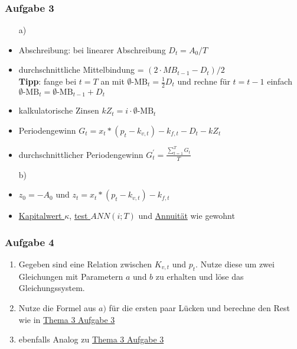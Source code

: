 \documentclass[12pt]{article}
\begin{document}
		\subsubsection*{Aufgabe 3} \label{Thema3Aufgabe3}
		\begin{itemize}
			\item[a)]
			\item Abschreibung: bei linearer Abschreibung $D_t=A_0/T$
			\item durchschnittliche Mittelbindung = $(2\cdot MB_{t-1}-D_t)/2$ \\
			\textbf{Tipp}: fange bei $t=T$ an mit $\emptyset\text{-MB}_{t}=\frac{1}{2}D_t$ und rechne für $t=t-1$ einfach $\emptyset\text{-MB}_{t}=\emptyset\text{-MB}_{t-1}+D_t$
			\item kalkulatorische Zinsen $kZ_t=i\cdot \emptyset\text{-MB}_t$
			\item Periodengewinn $G_t=x_t*(p_t-k_{v,t})-k_{f,t}-D_t-kZ_t$
			\item durchschnittlicher Periodengewinn $G_t^\prime=\frac{\sum_{t=1}^T G_t}{T}$
			\item[b)]
			\item $z_0=-A_0$ und $z_t=x_t*(p_t-k_{v,t})-k_{f,t}$
			\item \hyperref[Kapitalwert]{Kapitalwert $\kappa$}, \hyperref[Annuitaet]{test $ANN(i;T)$} und \hyperref[Annuitaet]{Annuität} wie gewohnt
		\end{itemize}
	
		\subsubsection*{Aufgabe 4}
		\begin{enumerate}[label=\alph*)]
			\item Gegeben sind eine Relation zwischen $K_{v,t}$ und $p_t$. Nutze diese um zwei Gleichungen mit Parametern $a$ und $b$ zu erhalten und löse das Gleichungssystem.
			\item Nutze die Formel aus $a)$ für die ersten paar Lücken und berechne den Rest wie in \hyperref[Thema3Aufgabe3]{Thema 3 Aufgabe 3}
			\item ebenfalls Analog zu \hyperref[Thema3Aufgabe3]{Thema 3 Aufgabe 3}
		\end{enumerate}
\end{document}
